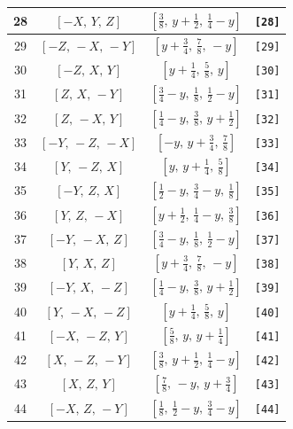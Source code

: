 \documentclass[fleqn,8pt]{jsarticle}
\begin{document}
\begin{longtable}{cccc}
28 & $\left[ - X,\, Y,\, Z \right]$ & $\left[ \frac{3}{8},\, y + \frac{1}{2},\, \frac{1}{4} - y \right]$ & {\tt [28]} \\ \hline
29 & $\left[ - Z,\, - X,\, - Y \right]$ & $\left[ y + \frac{3}{4},\, \frac{7}{8},\, - y \right]$ & {\tt [29]} \\ \hline
30 & $\left[ - Z,\, X,\, Y \right]$ & $\left[ y + \frac{1}{4},\, \frac{5}{8},\, y \right]$ & {\tt [30]} \\ \hline
31 & $\left[ Z,\, X,\, - Y \right]$ & $\left[ \frac{3}{4} - y,\, \frac{1}{8},\, \frac{1}{2} - y \right]$ & {\tt [31]} \\ \hline
32 & $\left[ Z,\, - X,\, Y \right]$ & $\left[ \frac{1}{4} - y,\, \frac{3}{8},\, y + \frac{1}{2} \right]$ & {\tt [32]} \\ \hline
33 & $\left[ - Y,\, - Z,\, - X \right]$ & $\left[ - y,\, y + \frac{3}{4},\, \frac{7}{8} \right]$ & {\tt [33]} \\ \hline
34 & $\left[ Y,\, - Z,\, X \right]$ & $\left[ y,\, y + \frac{1}{4},\, \frac{5}{8} \right]$ & {\tt [34]} \\ \hline
35 & $\left[ - Y,\, Z,\, X \right]$ & $\left[ \frac{1}{2} - y,\, \frac{3}{4} - y,\, \frac{1}{8} \right]$ & {\tt [35]} \\ \hline
36 & $\left[ Y,\, Z,\, - X \right]$ & $\left[ y + \frac{1}{2},\, \frac{1}{4} - y,\, \frac{3}{8} \right]$ & {\tt [36]} \\ \hline
37 & $\left[ - Y,\, - X,\, Z \right]$ & $\left[ \frac{3}{4} - y,\, \frac{1}{8},\, \frac{1}{2} - y \right]$ & {\tt [37]} \\ \hline
38 & $\left[ Y,\, X,\, Z \right]$ & $\left[ y + \frac{3}{4},\, \frac{7}{8},\, - y \right]$ & {\tt [38]} \\ \hline
39 & $\left[ - Y,\, X,\, - Z \right]$ & $\left[ \frac{1}{4} - y,\, \frac{3}{8},\, y + \frac{1}{2} \right]$ & {\tt [39]} \\ \hline
40 & $\left[ Y,\, - X,\, - Z \right]$ & $\left[ y + \frac{1}{4},\, \frac{5}{8},\, y \right]$ & {\tt [40]} \\ \hline
41 & $\left[ - X,\, - Z,\, Y \right]$ & $\left[ \frac{5}{8},\, y,\, y + \frac{1}{4} \right]$ & {\tt [41]} \\ \hline
42 & $\left[ X,\, - Z,\, - Y \right]$ & $\left[ \frac{3}{8},\, y + \frac{1}{2},\, \frac{1}{4} - y \right]$ & {\tt [42]} \\ \hline
43 & $\left[ X,\, Z,\, Y \right]$ & $\left[ \frac{7}{8},\, - y,\, y + \frac{3}{4} \right]$ & {\tt [43]} \\ \hline
44 & $\left[ - X,\, Z,\, - Y \right]$ & $\left[ \frac{1}{8},\, \frac{1}{2} - y,\, \frac{3}{4} - y \right]$ & {\tt [44]} \\ \hline

\end{longtable}
\end{document}
